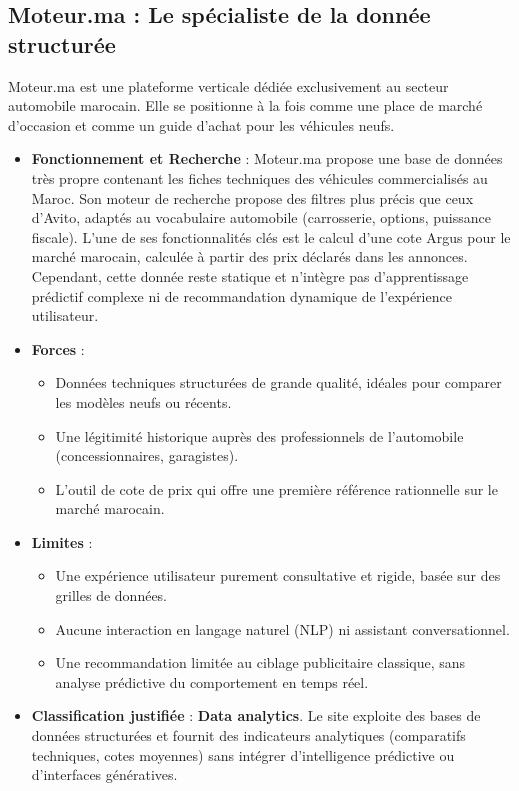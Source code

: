 \documentclass[11pt,a4paper]{article}
\begin{document}
\subsection{Moteur.ma : Le spécialiste de la donnée structurée}
Moteur.ma est une plateforme verticale dédiée exclusivement au secteur automobile marocain. Elle se positionne à la fois comme une place de marché d'occasion et comme un guide d'achat pour les véhicules neufs.

\begin{itemize}
    \item \textbf{Fonctionnement et Recherche} : Moteur.ma propose une base de données très propre contenant les fiches techniques des véhicules commercialisés au Maroc. Son moteur de recherche propose des filtres plus précis que ceux d'Avito, adaptés au vocabulaire automobile (carrosserie, options, puissance fiscale). L'une de ses fonctionnalités clés est le calcul d'une \og cote Argus \fg pour le marché marocain, calculée à partir des prix déclarés dans les annonces. Cependant, cette donnée reste statique et n'intègre pas d'apprentissage prédictif complexe ni de recommandation dynamique de l'expérience utilisateur.
    \item \textbf{Forces} :
    \begin{itemize}
        \item Données techniques structurées de grande qualité, idéales pour comparer les modèles neufs ou récents.
        \item Une légitimité historique auprès des professionnels de l'automobile (concessionnaires, garagistes).
        \item L'outil de cote de prix qui offre une première référence rationnelle sur le marché marocain.
    \end{itemize}
    \item \textbf{Limites} :
    \begin{itemize}
        \item Une expérience utilisateur purement consultative et rigide, basée sur des grilles de données.
        \item Aucune interaction en langage naturel (NLP) ni assistant conversationnel.
        \item Une recommandation limitée au ciblage publicitaire classique, sans analyse prédictive du comportement en temps réel.
    \end{itemize}
    \item \textbf{Classification justifiée} : \textbf{Data analytics}. Le site exploite des bases de données structurées et fournit des indicateurs analytiques (comparatifs techniques, cotes moyennes) sans intégrer d'intelligence prédictive ou d'interfaces génératives.
\end{itemize}
\end{document}
